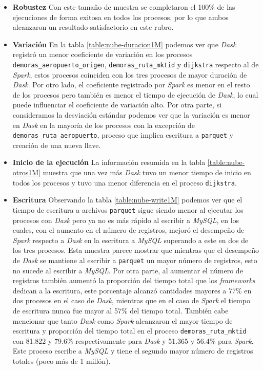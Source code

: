 \begin{itemize}
	\item \textbf{Robustez} Con este tamaño de muestra se completaron el 100\% de las ejecuciones de forma exitosa en todos los procesos, por lo que ambos alcanzaron un resultado satisfactorio en este rubro.

	\item \textbf{Variación} En la tabla \ref{table:nube-duracion1M} podemos ver que \textit{Dask} registró un menor coeficiente de variación en los procesos \texttt{demoras\_aeropuerto\_origen}, \texttt{demoras\_ruta\_mktid} y \texttt{dijkstra} respecto al de \textit{Spark}, estos procesos coinciden con los tres procesos de mayor duración de \textit{Dask}. Por otro lado, el coeficiente registrado por \textit{Spark} es menor en el resto de los procesos pero también es menor el tiempo de ejecución de \textit{Dask}, lo cual puede influenciar el coeficiente de variación alto. Por otra parte, si consideramos la desviación estándar podemos ver que la variación es menor en \textit{Dask} en la mayoría de los procesos con la excepción de \texttt{demoras\_ruta\_aeropuerto}, proceso que implica escritura a \texttt{parquet} y creación de una nueva llave.
	
	\item \textbf{Inicio de la ejecución} La información resumida en la tabla \ref{table:nube-otros1M} muestra que una vez más \textit{Dask} tuvo un menor tiempo de inicio en todos los procesos y tuvo una menor diferencia en el proceso \texttt{dijkstra}.
	
	\item \textbf{Escritura} Observando la tabla \ref{table:nube-write1M} podemos ver que el tiempo de escritura a archivos \texttt{parquet} sigue siendo menor al ejecutar los procesos con \textit{Dask} pero ya no es más rápido al escribir a \textit{MySQL}, en los cuales, con el aumento en el número de registros, mejoró el desempeño de \textit{Spark} respecto a \textit{Dask} en la escritura a \textit{MySQL} superando a este en dos de los tres procesos. Esta muestra parece mostrar que mientras que el desempeño de \textit{Dask} se mantiene al escribir a \texttt{parquet} un mayor número de registros, esto no sucede al escribir a \textit{MySQL}. Por otra parte, al aumentar el número de registros también aumentó la proporción del tiempo total que los \textit{frameworks} dedican a la escritura, este porcentaje alcanzó cantidades mayores a 77\% en dos procesos en el caso de \textit{Dask}, mientras que en el caso de \textit{Spark} el tiempo de escritura nunca fue mayor al 57\% del tiempo total. También cabe mencionar que tanto \textit{Dask} como \textit{Spark} alcanzaron el mayor tiempo de escritura y proporción del tiempo total en el proceso \texttt{demoras\_ruta\_mktid} con 81.822 y 79.6\% respectivamente para \textit{Dask} y 51.365 y 56.4\% para \textit{Spark}. Este proceso escribe a \textit{MySQL} y tiene el segundo mayor número de registros totales (poco más de 1 millón).
	

\end{itemize}
